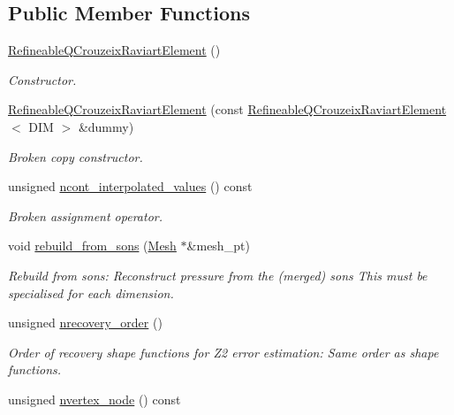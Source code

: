 \subsection*{Public Member Functions}
\begin{DoxyCompactItemize}
\item 
\hyperlink{classoomph_1_1RefineableQCrouzeixRaviartElement_a7b1e2fdef2e0e606da26318ce4921e6f}{Refineable\+Q\+Crouzeix\+Raviart\+Element} ()
\begin{DoxyCompactList}\small\item\em Constructor. \end{DoxyCompactList}\item 
\hyperlink{classoomph_1_1RefineableQCrouzeixRaviartElement_a2d15dd760eb7524fa9b0499e1edbabd2}{Refineable\+Q\+Crouzeix\+Raviart\+Element} (const \hyperlink{classoomph_1_1RefineableQCrouzeixRaviartElement}{Refineable\+Q\+Crouzeix\+Raviart\+Element}$<$ D\+IM $>$ \&dummy)
\begin{DoxyCompactList}\small\item\em Broken copy constructor. \end{DoxyCompactList}\item 
unsigned \hyperlink{classoomph_1_1RefineableQCrouzeixRaviartElement_a3f6b1ffd6ae7beef75c2347df90ec701}{ncont\+\_\+interpolated\+\_\+values} () const
\begin{DoxyCompactList}\small\item\em Broken assignment operator. \end{DoxyCompactList}\item 
void \hyperlink{classoomph_1_1RefineableQCrouzeixRaviartElement_ac0b49e03ad0b0586e19f8f72a79f8a0c}{rebuild\+\_\+from\+\_\+sons} (\hyperlink{classoomph_1_1Mesh}{Mesh} $\ast$\&mesh\+\_\+pt)
\begin{DoxyCompactList}\small\item\em Rebuild from sons\+: Reconstruct pressure from the (merged) sons This must be specialised for each dimension. \end{DoxyCompactList}\item 
unsigned \hyperlink{classoomph_1_1RefineableQCrouzeixRaviartElement_a623aa5e918f7e6acfee3107de07f4afb}{nrecovery\+\_\+order} ()
\begin{DoxyCompactList}\small\item\em Order of recovery shape functions for Z2 error estimation\+: Same order as shape functions. \end{DoxyCompactList}\item 
unsigned \hyperlink{classoomph_1_1RefineableQCrouzeixRaviartElement_aca4403f291e107cfcbf34009647c0527}{nvertex\+\_\+node} () const

\end{DoxyCompactItemize}
